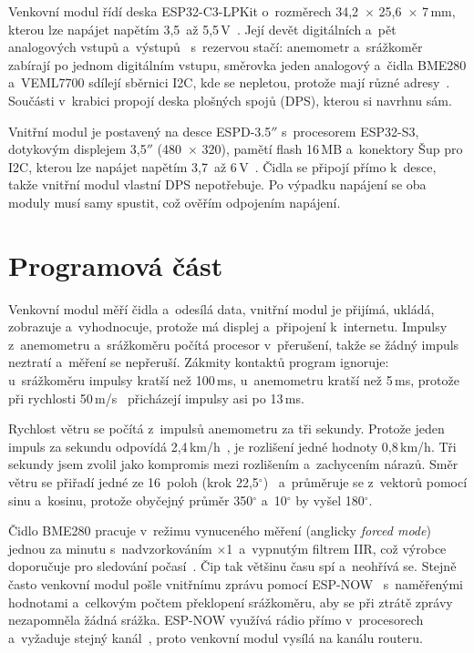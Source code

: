 Venkovní modul řídí deska ESP32-C3-LPKit o~rozměrech 34,2~$\times$ 25,6~$\times$ 7\,mm, kterou lze napájet napětím 3,5~až 5,5\,V~\cite{esp32c3lpkit}. Její devět digitálních a~pět analogových vstupů a~výstupů~\cite{esp32c3lpkit} s~rezervou stačí: anemometr a~srážkoměr zabírají po jednom digitálním vstupu, směrovka jeden analogový a~čidla BME280 a~VEML7700 sdílejí sběrnici I2C, kde se nepletou, protože mají různé adresy~\cite{bme280,veml7700}. Součásti v~krabici propojí deska plošných spojů (DPS), kterou si navrhnu sám.

Vnitřní modul je postavený na desce ESPD-3.5$''$ s~procesorem ESP32-S3, dotykovým displejem 3,5$''$ (480~$\times$ 320), pamětí flash 16\,MB a~konektory \textmu Šup pro I2C, kterou lze napájet napětím 3,7~až 6\,V~\cite{espd}. Čidla se připojí přímo k~desce, takže vnitřní modul vlastní DPS nepotřebuje. Po výpadku napájení se oba moduly musí samy spustit, což ověřím odpojením napájení.

\section{Programová část}

Venkovní modul měří čidla a~odesílá data, vnitřní modul je přijímá, ukládá, zobrazuje a~vyhodnocuje, protože má displej a~připojení k~internetu. Impulsy z~anemometru a~srážkoměru počítá procesor v~přerušení, takže se žádný impuls neztratí a~měření se nepřeruší. Zákmity kontaktů program ignoruje: u~srážkoměru impulsy kratší než 100\,ms, u~anemometru kratší než 5\,ms, protože při rychlosti 50\,m/s~\cite{fineoffset} přicházejí impulsy asi po 13\,ms.

Rychlost větru se počítá z~impulsů anemometru za tři sekundy. Protože jeden impuls za sekundu odpovídá 2,4\,km/h~\cite{macek}, je rozlišení jedné hodnoty 0,8\,km/h. Tři sekundy jsem zvolil jako kompromis mezi rozlišením a~zachycením nárazů. Směr větru se přiřadí jedné ze 16~poloh (krok 22,5$^\circ$)~\cite{sparkfun,macek} a~průměruje se z~vektorů pomocí sinu a~kosinu, protože obyčejný průměr 350$^\circ$ a~10$^\circ$ by vyšel 180$^\circ$.

Čidlo BME280 pracuje v~režimu vynuceného měření (anglicky \textit{forced mode}) jednou za minutu s~nadvzorkováním $\times$1~a~vypnutým filtrem IIR, což výrobce doporučuje pro sledování počasí~\cite{bme280}. Čip tak většinu času spí a~neohřívá se. Stejně často venkovní modul pošle vnitřnímu zprávu pomocí ESP-NOW~\cite{espnow} s~naměřenými hodnotami a~celkovým počtem překlopení srážkoměru, aby se při ztrátě zprávy nezapomněla žádná srážka. ESP-NOW využívá rádio přímo v~procesorech a~vyžaduje stejný kanál~\cite{espnow}, proto venkovní modul vysílá na kanálu routeru.

